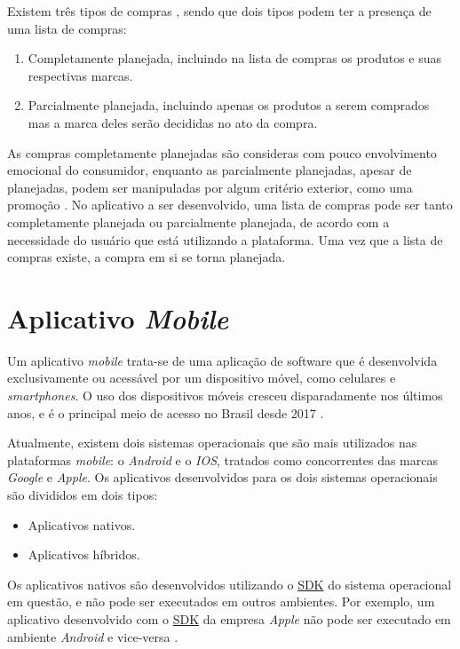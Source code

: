 Existem três tipos de compras \cite{ComprasNaoPlanejadas}, sendo que dois tipos podem ter a presença de uma lista de compras:
\begin{enumerate}
\item Completamente planejada, incluindo na lista de compras os produtos e suas respectivas marcas.
\item Parcialmente planejada, incluindo apenas os produtos a serem comprados mas a marca deles serão decididas no ato da compra.
\end{enumerate}

As compras completamente planejadas são consideras com pouco envolvimento emocional do consumidor, enquanto as parcialmente planejadas, apesar de planejadas, podem ser manipuladas por algum critério exterior, como uma promoção \cite{ComprasNaoPlanejadas}. No aplicativo a ser desenvolvido, uma lista de compras pode ser tanto completamente planejada ou parcialmente planejada, de acordo com a necessidade do usuário que está utilizando a plataforma. Uma vez que a lista de compras existe, a compra em si se torna planejada.

\section{Aplicativo \textit{Mobile}}
Um aplicativo \textit{mobile} trata-se de uma aplicação de software que é desenvolvida exclusivamente ou acessável por um dispositivo móvel, como celulares e \textit{smartphones}. O uso dos dispositivos móveis cresceu disparadamente nos últimos anos, e é o principal meio de acesso no Brasil desde 2017 \cite{Celular}.

Atualmente, existem dois sistemas operacionais que são mais utilizados nas plataformas \textit{mobile}: o \textit{Android} e o \textit{IOS}, tratados como concorrentes das marcas \textit{Google} e \textit{Apple}. Os aplicativos desenvolvidos para os dois sistemas operacionais são divididos em dois tipos:
\begin{itemize}
\item Aplicativos nativos.
\item Aplicativos híbridos.
\end{itemize}

Os aplicativos nativos são desenvolvidos utilizando o \label{sig:SDK}\hyperlink{s:SDK}{SDK} do sistema operacional em questão, e não pode ser executados em outros ambientes. Por exemplo, um aplicativo desenvolvido com o \label{sig:SDK}\hyperlink{s:SDK}{SDK} da empresa \textit{Apple} não pode ser executado em ambiente \textit{Android} e vice-versa \cite{MobileApps}.

